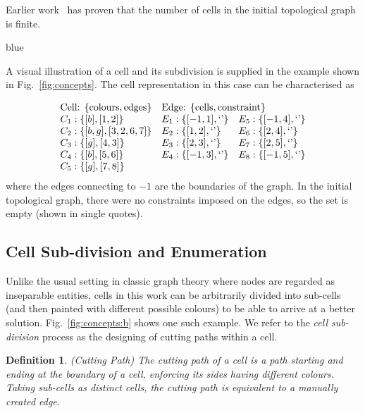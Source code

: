 \documentclass[journal]{IEEEtran}
\newtheorem{definition}[theorem]{Definition}
\begin{document}
Earlier work~\cite{Yang2020Cellular} has proven that the number of cells in the initial topological graph is finite. 
\begin{color}{blue}

A visual illustration of a cell and its subdivision is supplied in the example shown in Fig.~\ref{fig:concepts}. 
The cell representation in this case can be characterised as 

\begin{equation}
\begin{array}{lll}
\mbox{Cell: }\{{\rm colours}, {\rm edges}\}     &  \multicolumn{2}{l}{\mbox{Edge: }\{{\rm cells}, {\rm constraint}\}}\\
C_1: \{[b], [1, 2]\}     & E_1: \{[-1, 1], \mbox{`'}\} & E_5: \{[-1, 4], \mbox{`'}\}\\
C_2: \{[b, g], [3, 2, 6, 7]\} & E_2: \{[1, 2], \mbox{`'}\} & E_6: \{[2, 4], \mbox{`'}\}\\
C_3: \{[g], [4, 3]\} & E_3: \{[2, 3], \mbox{`'}\} & E_7: \{[2, 5], \mbox{`'}\}\\
C_4: \{[b], [5, 6]\} & E_4: \{[-1, 3], \mbox{`'}\} & E_8: \{[-1, 5], \mbox{`'}\}\\
C_5: \{[g], [7, 8]\}&&
\end{array}
\end{equation}
where the edges connecting to $-1$ are the boundaries of the graph. 
In the initial topological graph, there were no constraints imposed on the edges, so the set is empty (shown in single quotes). 

\subsection{Cell Sub-division and Enumeration}\label{subsection_cell_subdivision}
Unlike the usual setting in classic graph theory where nodes are regarded as inseparable entities, cells in this work can be arbitrarily divided into sub-cells (and then painted with different possible colours) to be able to arrive at a better solution. 
Fig.~\ref{fig:concepts:b} shows one such example. 
We refer to the \textit{cell sub-division} process as the designing of cutting paths within a cell. 
\begin{definition}
(Cutting Path) The cutting path of a cell is a path starting and ending at the boundary of a cell, enforcing its sides having different colours. 
Taking sub-cells as distinct cells, the cutting path is equivalent to a manually created edge. 
\end{definition}
\end{color}
\end{document}
